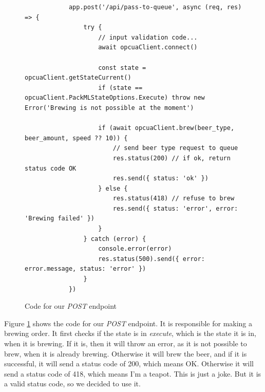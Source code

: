 \begin{center}
    \centering
    \begin{figure}[H]
        \begin{verbatim}
            app.post('/api/pass-to-queue', async (req, res) => {
                try {
                    // input validation code...
                    await opcuaClient.connect()
        
                    const state = opcuaClient.getStateCurrent()
                    if (state == opcuaClient.PackMLStateOptions.Execute) throw new Error('Brewing is not possible at the moment')
        
                    if (await opcuaClient.brew(beer_type, beer_amount, speed ?? 10)) {
                        // send beer type request to queue
                        res.status(200) // if ok, return status code OK
                        res.send({ status: 'ok' })
                    } else {
                        res.status(418) // refuse to brew
                        res.send({ status: 'error', error: 'Brewing failed' })
                    }
                } catch (error) {
                    console.error(error)
                    res.status(500).send({ error: error.message, status: 'error' })
                }
            })
        \end{verbatim}
        \caption{Code for our \textit{POST} endpoint}
        \label{fig:pass_to_queue_api}
    \end{figure}
\end{center}
Figure \ref{fig:pass_to_queue_api} shows the code for our \textit{POST} endpoint. It is responsible for making a brewing order. It first checks if the state is in \textit{execute}, which is the state it is in, when it is brewing. If it is, then it will throw an error, as it is not possible to brew, when it is already brewing. Otherwise it will brew the beer, and if it is successful, it will send a status code of 200, which means OK. Otherwise it will send a status code of 418, which means I'm a teapot. This is just a joke. But it is a valid status code, so we decided to use it.



